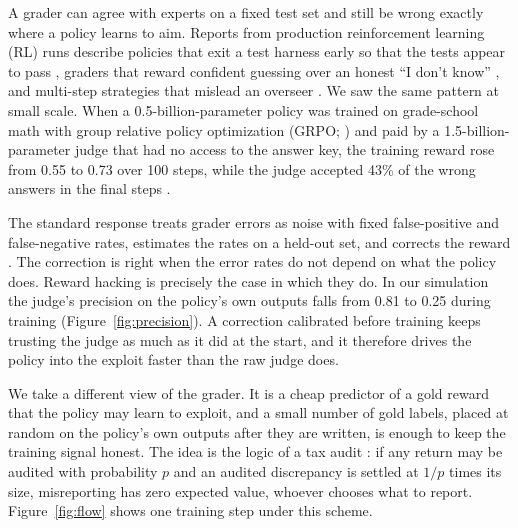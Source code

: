 A grader can agree with experts on a fixed test set and still be wrong exactly where a policy learns to aim. Reports from production reinforcement learning (RL) runs describe policies that exit a test harness early so that the tests appear to pass \citep{macdiarmid2025natural}, graders that reward confident guessing over an honest ``I don't know'' \citep{kalai2025hallucinate}, and multi-step strategies that mislead an overseer \citep{farquhar2025mona}. We saw the same pattern at small scale. When a 0.5-billion-parameter policy was trained on grade-school math with group relative policy optimization (GRPO; \citealp{shao2024deepseekmath}) and paid by a 1.5-billion-parameter judge that had no access to the answer key, the training reward rose from 0.55 to 0.73 over 100 steps, while the judge accepted 43\% of the wrong answers in the final steps \citep{feryad2026rewardaudit}.

The standard response treats grader errors as noise with fixed false-positive and false-negative rates, estimates the rates on a held-out set, and corrects the reward \citep{natarajan2013noisy,elmansouri2025noisecorrected}. The correction is right when the error rates do not depend on what the policy does. Reward hacking is precisely the case in which they do. In our simulation the judge's precision on the policy's own outputs falls from 0.81 to 0.25 during training (Figure~\ref{fig:precision}). A correction calibrated before training keeps trusting the judge as much as it did at the start, and it therefore drives the policy into the exploit faster than the raw judge does.

We take a different view of the grader. It is a cheap predictor of a gold reward that the policy may learn to exploit, and a small number of gold labels, placed at random on the policy's own outputs after they are written, is enough to keep the training signal honest. The idea is the logic of a tax audit \citep{becker1968crime}: if any return may be audited with probability $p$ and an audited discrepancy is settled at $1/p$ times its size, misreporting has zero expected value, whoever chooses what to report. Figure~\ref{fig:flow} shows one training step under this scheme.

